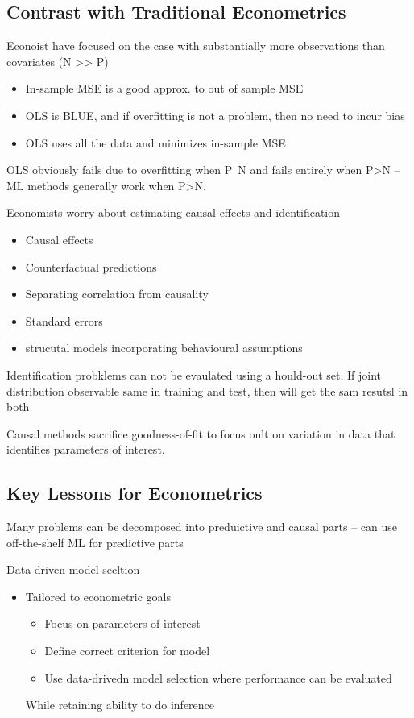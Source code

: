 \documentclass{article}
\begin{document}
\subsection{Contrast with Traditional Econometrics}

Econoist have focused on the case with substantially more observations than covariates (N >> P)
\begin{itemize}
    \item In-sample MSE is a good approx. to out of sample MSE
    \item OLS is BLUE, and if overfitting is not a problem, then no need to incur bias
    \item OLS uses all the data and minimizes in-sample MSE
\end{itemize}

OLS obviously fails due to overfitting when P~N and fails entirely when P>N -- ML methods generally work when P>N.

Economists worry about estimating causal effects and identification
\begin{itemize}
    \item Causal effects
    \item Counterfactual predictions
    \item Separating correlation from causality
    \item Standard errors
    \item strucutal models incorporating behavioural assumptions
\end{itemize}

Identification probklems can not be evaulated using a hould-out set. If joint distribution observable same in training and test, then will get the sam resutsl in both

Causal methods sacrifice goodness-of-fit to focus onlt on variation in data that identifies parameters of interest.

\subsection{Key Lessons for Econometrics}

Many problems can be decomposed into preduictive and causal parts -- can use off-the-shelf ML for predictive parts

Data-driven model secltion
\begin{itemize}
    \item Tailored to econometric goals
    \begin{itemize}
        \item Focus on parameters of interest
        \item Define correct criterion for model
        \item Use data-drivedn model selection where performance can be evaluated
    \end{itemize}
    While retaining ability to do inference
\end{itemize}
\end{document}
